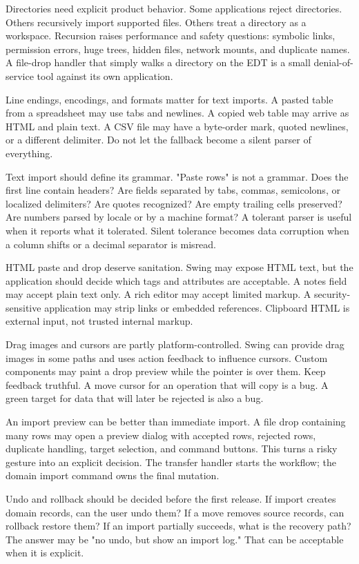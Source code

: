 Directories need explicit product behavior. Some applications reject directories. Others recursively import supported files. Others treat a directory as a workspace. Recursion raises performance and safety questions: symbolic links, permission errors, huge trees, hidden files, network mounts, and duplicate names. A file-drop handler that simply walks a directory on the EDT is a small denial-of-service tool against its own application.

Line endings, encodings, and formats matter for text imports. A pasted table from a spreadsheet may use tabs and newlines. A copied web table may arrive as HTML and plain text. A CSV file may have a byte-order mark, quoted newlines, or a different delimiter. Do not let the  fallback become a silent parser of everything.

Text import should define its grammar. "Paste rows" is not a grammar. Does the first line contain headers? Are fields separated by tabs, commas, semicolons, or localized delimiters? Are quotes recognized? Are empty trailing cells preserved? Are numbers parsed by locale or by a machine format? A tolerant parser is useful when it reports what it tolerated. Silent tolerance becomes data corruption when a column shifts or a decimal separator is misread.

HTML paste and drop deserve sanitation. Swing may expose HTML text, but the application should decide which tags and attributes are acceptable. A notes field may accept plain text only. A rich editor may accept limited markup. A security-sensitive application may strip links or embedded references. Clipboard HTML is external input, not trusted internal markup.

Drag images and cursors are partly platform-controlled. Swing can provide drag images in some paths and uses action feedback to influence cursors. Custom components may paint a drop preview while the pointer is over them. Keep feedback truthful. A move cursor for an operation that will copy is a bug. A green target for data that will later be rejected is also a bug.

An import preview can be better than immediate import. A file drop containing many rows may open a preview dialog with accepted rows, rejected rows, duplicate handling, target selection, and command buttons. This turns a risky gesture into an explicit decision. The transfer handler starts the workflow; the domain import command owns the final mutation.

Undo and rollback should be decided before the first release. If import creates domain records, can the user undo them? If a move removes source records, can rollback restore them? If an import partially succeeds, what is the recovery path? The answer may be "no undo, but show an import log." That can be acceptable when it is explicit.

